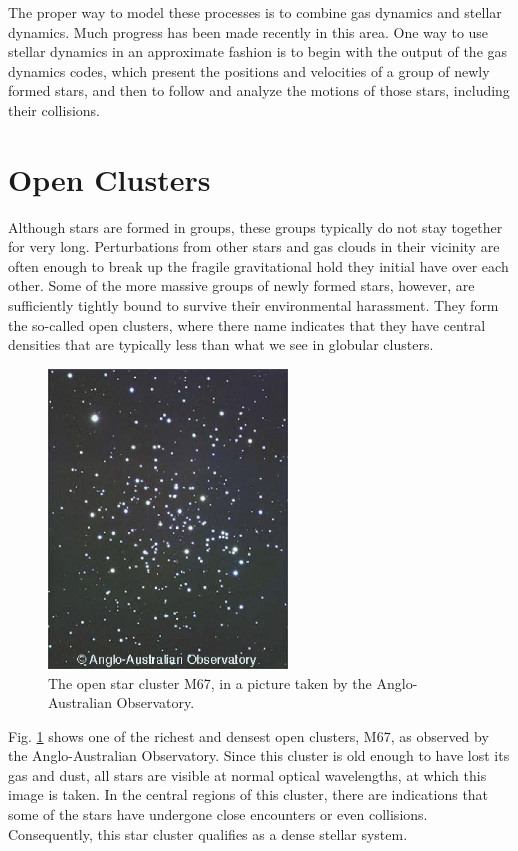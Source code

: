 The proper way to model these processes is to combine gas dynamics and
stellar dynamics.  Much progress has been made recently in this area.
One way to use stellar dynamics in an approximate fashion is to begin
with the output of the gas dynamics codes, which present the positions
and velocities of a group of newly formed stars, and then to follow
and analyze the motions of those stars, including their collisions.

\section{Open Clusters}

Although stars are formed in groups, these groups typically do not
stay together for very long.  Perturbations from other stars and gas
clouds in their vicinity are often enough to break up the fragile
gravitational hold they initial have over each other.  Some of the
more massive groups of newly formed stars, however, are sufficiently
tightly bound to survive their environmental harassment.  They form
the so-called open clusters, where there name indicates that they have
central densities that are typically less than what we see in globular
clusters.

\begin{figure}[ht]
\centering
\includegraphics[width=2.5in]{chap1/m67.ps}
\caption[The open star cluster M67]
{The open star cluster M67, in a picture taken by the Anglo-Australian
Observatory.}
\label{fig:m67}
\end{figure}

Fig. \ref{fig:m67} shows one of the richest and densest open clusters,
M67, as observed by the Anglo-Australian Observatory.  Since this
cluster is old enough to have lost its gas and dust, all stars are
visible at normal optical wavelengths, at which this image is taken.
In the central regions of this cluster, there are indications that
some of the stars have undergone close encounters or even collisions.
Consequently, this star cluster qualifies as a dense stellar system.


